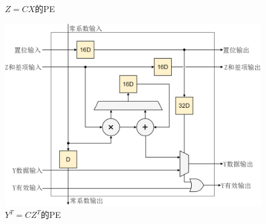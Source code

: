 \documentclass{article}
\numberwithin {equation}{section}
\begin{document}
\begin{spacing}{1.25}
\begin{figure}[H]
          \caption{$Z=CX$的PE}
          \label{x2zPE}
        \end{figure}
        \begin{figure}[H]
          \centering
          \includegraphics[scale=0.25]{./pictures/z2yPE.png}
          \caption{$Y^{T}=CZ^{T}$的PE}
          \label{z2yPE}
        \end{figure}


\end{spacing}
\end{document}
